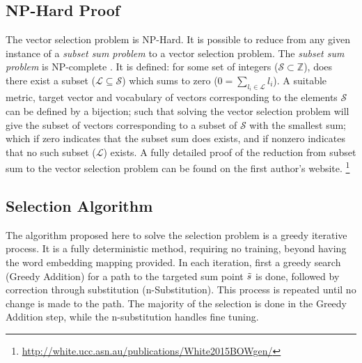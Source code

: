 \documentclass{book}
\begin{document}
\subsection{NP-Hard Proof}
The vector selection problem is NP-Hard. It is possible to reduce from any given instance of a \emph{subset sum problem} to a vector selection problem. The \emph{subset sum problem} is NP-complete \parencite{karp1972reducibility}. It is defined: for some set of integers ($\mathcal{S}\subset\mathbb{Z}$), does there exist a subset ($\mathcal{L}\subseteq\mathcal{S}$) which sums to zero ($0=\sum_{l_i\in \mathcal{L}} l_i$).  A suitable metric, target vector and  vocabulary of vectors corresponding to the elements $\mathcal{S}$ can be defined by a bijection; such that solving the vector selection problem will give the subset of vectors corresponding to a subset of $\mathcal{S}$ with the smallest sum; which if zero indicates that the subset sum does exists, and if nonzero indicates that no such subset ($\mathcal{L}$) exists. A fully detailed proof of the reduction from subset sum to the vector selection problem can be found on the first author's website. \footnote{\url{http://white.ucc.asn.au/publications/White2015BOWgen/}}





\subsection{Selection Algorithm}
The algorithm proposed here to solve the selection problem is a greedy iterative process. It is a fully deterministic method, requiring no training, beyond having the word embedding mapping provided. In each iteration, first a greedy search (Greedy Addition) for a path to the targeted sum point $\tilde{s}$ is done, followed by correction through substitution (n-Substitution). This process is repeated until no change is made to the path. The majority of the selection is done in the Greedy Addition step, while the n-substitution handles fine tuning. 
\end{document}
